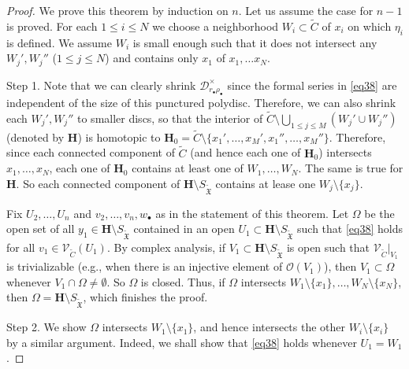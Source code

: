 \documentclass[12pt,a4paper,notitlepage]{article}
\theoremstyle{definition}
\theoremstyle{plain}
\newcommand{\fk}{\mathfrak}
\newcommand{\mc}{\mathcal}
\newcommand{\wtd}{\widetilde}
\newcommand{\scr}{\mathscr}
\newcommand{\mbf}{\mathbf}
\newcommand{\blt}{\bullet}
\newcommand{\SXtd}{S_{\wtd{\fk X}}}
\numberwithin{equation}{section}
\begin{document}
\begin{proof}
We prove this theorem by induction on $n$. Let us assume the case for  $n-1$ is proved. For each $1\leq i\leq N$ we choose a neighborhood $W_i\subset\wtd C$ of $x_i$ on which $\eta_i$ is defined. We assume $W_i$ is small enough such that it does not intersect any $W_j',W_j''$ ($1\leq j\leq N$) and contains only $x_1$ of $x_1,\dots x_N$.	







Step 1.  Note that we can clearly shrink $\mc D_{r_\blt\rho_\blt}^\times$ since the formal series in \eqref{eq38} are independent of the size of this punctured polydisc. Therefore, we can also shrink each $W_j',W_j''$ to smaller discs, so that the interior of $\wtd C\setminus\bigcup_{1\leq j\leq M}(W_j'\cup W_j'')$ (denoted by $\mbf H$) is homotopic to $\mbf H_0=\wtd C\setminus\{x_1',\dots,x_M',x_1'',\dots,x_M''\}$. Therefore, since each connected component of $\wtd C$ (and hence each one of $\mbf H_0$) intersects $x_1,\dots,x_N$, each one of $\mbf H_0$ contains at least one of $W_1,\dots,W_N$. The same is true for $\mbf H$. So each connected component of $\mbf H\setminus\SXtd$ contains at lease one $W_j\setminus\{x_j\}$.

Fix $U_2,\dots,U_n$ and $v_2,\dots,v_n,w_\blt$ as in the statement of this theorem. Let $\Omega$ be the open set of all $y_1\in\mbf H\setminus\SXtd$ contained in an open $U_1\subset\mbf H\setminus\SXtd$ such that  \eqref{eq38} holds for all $v_1\in\scr V_{\wtd C}(U_1)$. By complex analysis, if $V_1\subset\mbf H\setminus\SXtd$ is open such that $\scr V_{\wtd C}|_{V_1}$ is trivializable (e.g., when there is an injective element of $\scr O(V_1)$), then $V_1\subset\Omega$ whenever $V_1\cap \Omega\neq\emptyset$. So $\Omega$ is closed. Thus, if $\Omega$ intersects $W_1\setminus\{x_1\},\dots,W_N\setminus\{x_N\}$, then $\Omega=\mbf H\setminus\SXtd$, which finishes the proof.

Step 2. We show $\Omega$ intersects $W_1\setminus\{x_1\}$, and hence intersects the other $W_i\setminus\{x_i\}$ by a similar argument. Indeed, we shall show that \eqref{eq38} holds whenever $U_1=W_1$. 



\end{proof}
\end{document}
